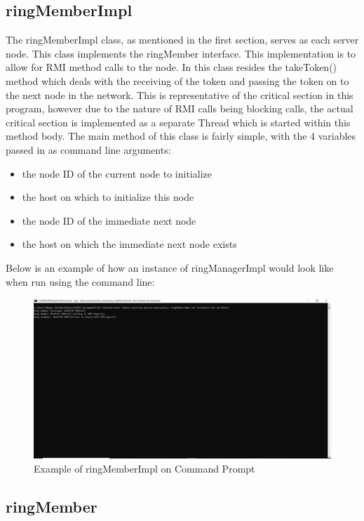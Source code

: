 \documentclass[11pt, a4paper]{article}
\begin{document}
\subsection{ringMemberImpl}

The ringMemberImpl class, as mentioned in the first section, serves as each server node. This class implements the ringMember interface. This implementation is to allow for RMI method calls to the node. In this class resides the takeToken() method which deals with the receiving of the token and passing the token on to the next node in the network. This is representative of the critical section in this program, however due to the nature of RMI calls being blocking calls, the actual critical section is implemented as a separate Thread which is started within this method body. The main method of this class is fairly simple, with the 4 variables passed in as command line arguments:
\begin{itemize}
\item the node ID of the current node to initialize
\item the host on which to initialize this node
\item the node ID of the immediate next node
\item the host on which the immediate next node exists
\end{itemize}
Below is an example of how an instance of ringManagerImpl would look like when run using the command line:
\begin{figure}
\centering
\includegraphics[scale=0.35]{ring_memberimpl_example}
\caption{Example of ringMemberImpl on Command Prompt}
\end{figure}

\subsection{ringMember}
\end{document}

